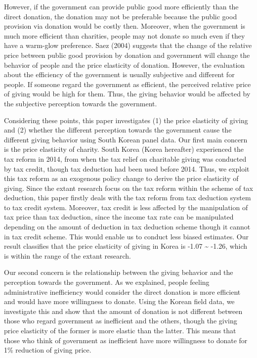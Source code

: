 \documentclass[ review  , 3p ]{elsarticle}
\begin{document}
  However, if the government can provide public good more efficiently than the direct donation, the donation may not be preferable because the public good provision via donation would be costly then.
  Moreover, when the government is much more efficient than charities, people may not donate so much even if they have a warm-glow preference. Saez (2004) suggests that the change of the relative price between public good provision by donation and government will change the behavior of people and the price elasticity of donation.
  However, the evaluation about the efficiency of the government is usually subjective and different for people. If someone regard the government as efficient, the perceived relative price of giving would be high for them. Thus, the giving behavior would be affected by the subjective perception towards the government.
  
  Considering these points, this paper investigates (1) the price elasticity of giving and (2) whether the different perception towards the government cause the different giving behavior using South Korean panel data.
  Our first main concern is the price elasticity of charity. South Korea (Korea hereafter) experienced the tax reform in 2014, from when the tax relief on charitable giving was conducted by tax credit, though tax deduction had been used before 2014. Thus, we exploit this tax reform as an exogenous policy change to derive the price elasticity of giving. Since the extant research focus on the tax reform within the scheme of tax deduction, this paper firstly deals with the tax reform from tax deduction system to tax credit system. Moreover, tax credit is less affected by the manipulation of tax price than tax deduction, since the income tax rate can be manipulated depending on the amount of deduction in tax deduction scheme though it cannot in tax credit scheme. This would enable us to conduct less biased estimates.
  Our result classifies that the price elasticity of giving in Korea is -1.07 \textasciitilde{} -1.26, which is within the range of the extant research.
  
  Our second concern is the relationship between the giving behavior and the perception towards the government. As we explained, people feeling administrative inefficiency would consider the direct donation is more efficient and would have more willingness to donate. Using the Korean field data, we investigate this and show that the amount of donation is not different between those who regard government as inefficient and the others, though the giving price elasticity of the former is more elastic than the latter. This means that those who think of government as inefficient have more willingness to donate for 1\% reduction of giving price.
  
\end{document}
